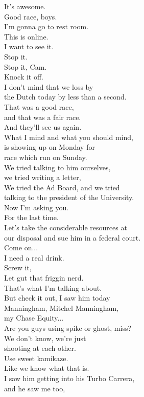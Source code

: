 \documentclass{article}
\begin{document}
\begin{multicols}{3}
It's awesome.\\
Good race, boys.\\
I'm gonna go to rest room.\\
This is online.\\
I want to see it.\\
Stop it.\\
Stop it, Cam.\\
Knock it off.\\
I don't mind that we loss by\\
the Dutch today by less than a second.\\
That was a good race,\\
and that was a fair race.\\
And they'll see us again.\\
What I mind and what you should mind,\\
is showing up on Monday for\\
race which run on Sunday.\\
We tried talking to him ourselves,\\
we tried writing a letter,\\
We tried the Ad Board, and we tried\\
talking to the president of the University.\\
Now I'm asking you.\\
For the last time.\\
Let's take the considerable resources at\\
our disposal and sue him in a federal court.\\
Come on...\\
I need a real drink.\\
Screw it,\\
Let gut that friggin nerd.\\
That's what I'm talking about.\\
But check it out, I saw him today\\
Manningham, Mitchel Manningham,\\
my Chase Equity...\\
Are you guys using spike or ghost, miss?\\
We don't know, we're just\\
shooting at each other.\\
Use sweet kamikaze.\\
Like we know what that is.\\
I saw him getting into his Turbo Carrera,\\
and he saw me too,\\

\end{multicols}
\end{document}
